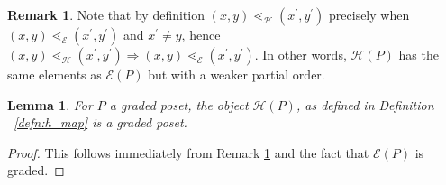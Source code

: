 \documentclass[10 pt]{amsart}
\theoremstyle{plain}
\newtheorem{lem}[thm]{Lemma}
\theoremstyle{definition}
\newtheorem{rem}[thm]{Remark}
\theoremstyle{remark}
\numberwithin{equation}{section}
\begin{document}
\begin{rem}\label{rem:order_containment}
Note that by definition $(x,y)\lessdot_{\mathcal{H}} (x^\prime,y^\prime)$ precisely when $(x,y)\lessdot_{\mathcal{E}} (x^\prime,y^\prime)$ and $x^\prime\neq y$, hence $(x, y)\lessdot_{\mathcal{H}} (x^\prime, y^\prime) \Rightarrow (x, y)\lessdot_{\mathcal E} (x^\prime, y^\prime)$.  In other words, $\mathcal{H}(P)$ has the same elements as $\mathcal{E}(P)$ but with a weaker partial order.
\end{rem}


\begin{lem}\label{lem:HP_order}
For $P$ a graded poset, the object $\mathcal{H}(P)$, as defined in Definition ~\ref{defn:h_map} is a graded poset.
\end{lem}

\begin{proof}
This follows immediately from Remark \ref{rem:order_containment} and the fact that $\mathcal E(P)$ is graded.
\end{proof}

\end{document}

